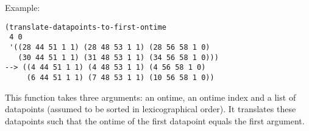 \vspace{0.5cm}
\noindent Example:
\begin{verbatim}
(translate-datapoints-to-first-ontime
 4 0
 '((28 44 51 1 1) (28 48 53 1 1) (28 56 58 1 0)
   (30 44 51 1 1) (31 48 53 1 1) (34 56 58 1 0)))
--> ((4 44 51 1 1) (4 48 53 1 1) (4 56 58 1 0)
     (6 44 51 1 1) (7 48 53 1 1) (10 56 58 1 0))
\end{verbatim}

\noindent This function takes three arguments: an
ontime, an ontime index and a list of datapoints
(assumed to be sorted in lexicographical order). It
translates these datapoints such that the ontime of
the first datapoint equals the first argument.




















